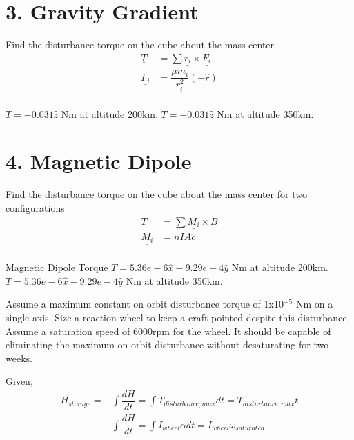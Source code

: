 \documentclass[onecolumn,10pt]{jhwhw}
\begin{document}
\part{3. Gravity Gradient}
Find the disturbance torque on the cube about the mass center
\begin{align*}
\underline{T} &= \sum \underline{r_i} \times \underline{F_i} \\
\underline{F_i} &= \dfrac{\mu m_i}{r_i^2} \left(- \hat{r} \right) \\
\end{align*}

$T = -0.031 \hat{z}$ Nm at altitude 200km. $T = -0.031 \hat{z}$ Nm at altitude 350km.

\part{4. Magnetic Dipole}
Find the disturbance torque on the cube about the mass center for two configurations
\begin{align*}
\underline{T} &= \sum \underline{M_i} \times \underline{B} \\
\underline{M_i} &= nIA\hat{c} \\
\end{align*}

Magnetic Dipole Torque
$T = 5.36e-6\hat{x} -9.29e-4\hat{y}$ Nm at altitude 200km. $T = 5.36e-6\hat{x} -9.29e-4\hat{y}$ Nm at altitude 350km.

Assume a maximum constant on orbit disturbance torque of 1x10$^{-5}$ Nm on a single axis. Size a reaction wheel to keep a craft pointed despite this disturbance. Assume a saturation speed of 6000rpm for the wheel. It should be capable of eliminating the maximum on orbit disturbance without desaturating for two weeks.

Given,
\begin{align*}
H_{{storage}} =& \int \dfrac{dH}{dt} = \int T_{{disturbance,max}} dt = T_{{disturbance,max}}t \\
& \int \dfrac{dH}{dt} = \int I_{{wheel}} \alpha dt = I_{{wheel}} \omega_{{saturated}}
\end{align*}
\end{document}

